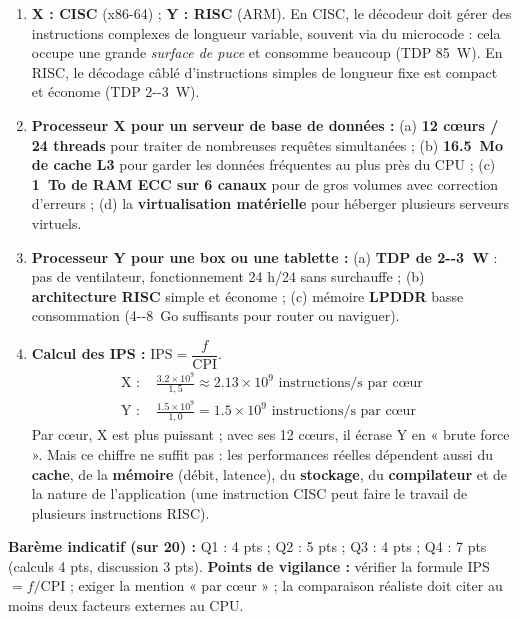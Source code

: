 \documentclass[11pt]{article}
\begin{document}
\begin{corrige}
\begin{enumerate}
    \item \textbf{X : CISC} (x86-64) ; \textbf{Y : RISC} (ARM). En CISC, le décodeur doit gérer des instructions complexes de longueur variable, souvent via du microcode : cela occupe une grande \emph{surface de puce} et consomme beaucoup (TDP \SI{85}{W}). En RISC, le décodage câblé d'instructions simples de longueur fixe est compact et économe (TDP \SI{2--3}{W}).
    \item \textbf{Processeur X pour un serveur de base de données :} (a) \textbf{12 cœurs / 24 threads} pour traiter de nombreuses requêtes simultanées ; (b) \textbf{\SI{16,5}{Mo} de cache L3} pour garder les données fréquentes au plus près du CPU ; (c) \textbf{\SI{1}{To} de RAM ECC sur 6 canaux} pour de gros volumes avec correction d'erreurs ; (d) la \textbf{virtualisation matérielle} pour héberger plusieurs serveurs virtuels.
    \item \textbf{Processeur Y pour une box ou une tablette :} (a) \textbf{TDP de \SI{2--3}{W}} : pas de ventilateur, fonctionnement 24 h/24 sans surchauffe ; (b) \textbf{architecture RISC} simple et économe ; (c) mémoire \textbf{LPDDR} basse consommation (\SI{4--8}{Go} suffisants pour router ou naviguer).
    \item \textbf{Calcul des IPS :} $\text{IPS} = \dfrac{f}{\text{CPI}}$.
    \begin{align*}
    \text{X : } & \frac{\num{3,2} \times 10^{9}}{1,5} \approx \num{2,13} \times 10^{9} \text{ instructions/s par c\oe ur} \\
    \text{Y : } & \frac{\num{1,5} \times 10^{9}}{1,0} = \num{1,5} \times 10^{9} \text{ instructions/s par c\oe ur}
    \end{align*}
    Par cœur, X est plus puissant ; avec ses 12 cœurs, il écrase Y en « brute force ». Mais ce chiffre ne suffit pas : les performances réelles dépendent aussi du \textbf{cache}, de la \textbf{mémoire} (débit, latence), du \textbf{stockage}, du \textbf{compilateur} et de la nature de l'application (une instruction CISC peut faire le travail de plusieurs instructions RISC).
\end{enumerate}
\textbf{Barème indicatif (sur 20) :} Q1 : 4 pts ; Q2 : 5 pts ; Q3 : 4 pts ; Q4 : 7 pts (calculs 4 pts, discussion 3 pts).
\textbf{Points de vigilance :} vérifier la formule IPS $= f/\text{CPI}$ ; exiger la mention « par cœur » ; la comparaison réaliste doit citer au moins deux facteurs externes au CPU.
\end{corrige}
\end{document}
